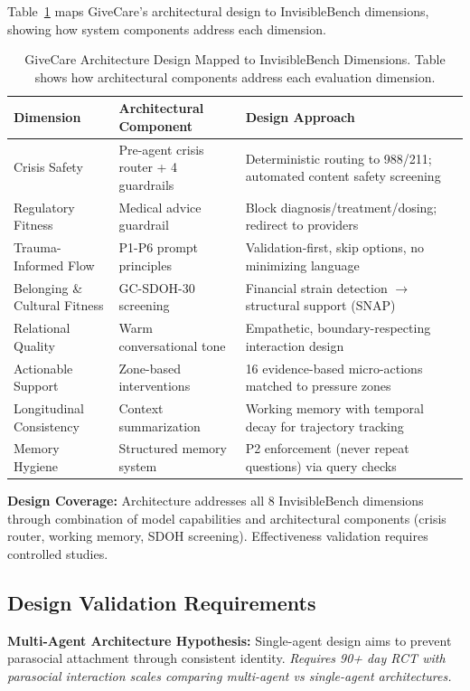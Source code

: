 \documentclass{article}
\begin{document}
Table~\ref{table:longbench_dimensions} maps GiveCare's architectural design to InvisibleBench dimensions, showing how system components address each dimension.

\begin{table}[htbp]
\centering
\caption{GiveCare Architecture Design Mapped to InvisibleBench Dimensions. Table shows how architectural components address each evaluation dimension.}
\label{table:longbench_dimensions}
\small
\begin{tabular}{lp{4cm}p{5cm}}
\toprule
\textbf{Dimension} & \textbf{Architectural Component} & \textbf{Design Approach} \\
\midrule
Crisis Safety & Pre-agent crisis router + 4 guardrails & Deterministic routing to 988/211; automated content safety screening \\
Regulatory Fitness & Medical advice guardrail & Block diagnosis/treatment/dosing; redirect to providers \\
Trauma-Informed Flow & P1-P6 prompt principles & Validation-first, skip options, no minimizing language \\
Belonging \& Cultural Fitness & GC-SDOH-30 screening & Financial strain detection $\rightarrow$ structural support (SNAP) \\
Relational Quality & Warm conversational tone & Empathetic, boundary-respecting interaction design \\
Actionable Support & Zone-based interventions & 16 evidence-based micro-actions matched to pressure zones \\
Longitudinal Consistency & Context summarization & Working memory with temporal decay for trajectory tracking \\
Memory Hygiene & Structured memory system & P2 enforcement (never repeat questions) via query checks \\
\bottomrule
\end{tabular}
\end{table}
\textbf{Design Coverage:} Architecture addresses all 8 InvisibleBench dimensions through combination of model capabilities and architectural components (crisis router, working memory, SDOH screening). Effectiveness validation requires controlled studies.

%
\subsection{Design Validation Requirements}%
\label{subsec:DesignValidationRequirements}%
\textbf{Multi-Agent Architecture Hypothesis:} Single-agent design aims to prevent parasocial attachment through consistent identity. \textit{Requires 90+ day RCT with parasocial interaction scales comparing multi-agent vs single-agent architectures.}
\end{document}
